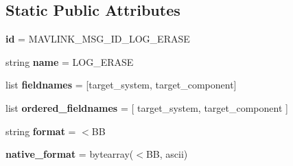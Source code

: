 \subsection*{Static Public Attributes}
\begin{DoxyCompactItemize}
\item 
\mbox{\label{classpymavlink_1_1dialects_1_1v10_1_1MAVLink__log__erase__message_a321eb50f2bdc57f03e38259f9eac8d6c}} 
{\bfseries id} = M\+A\+V\+L\+I\+N\+K\+\_\+\+M\+S\+G\+\_\+\+I\+D\+\_\+\+L\+O\+G\+\_\+\+E\+R\+A\+SE
\item 
\mbox{\label{classpymavlink_1_1dialects_1_1v10_1_1MAVLink__log__erase__message_a5597c5d067a3205a0be2e81559181d2f}} 
string {\bfseries name} = \textquotesingle{}L\+O\+G\+\_\+\+E\+R\+A\+SE\textquotesingle{}
\item 
\mbox{\label{classpymavlink_1_1dialects_1_1v10_1_1MAVLink__log__erase__message_a051bd4f738aa5256ac62944eaeee8a1f}} 
list {\bfseries fieldnames} = \mbox{[}\textquotesingle{}target\+\_\+system\textquotesingle{}, \textquotesingle{}target\+\_\+component\textquotesingle{}\mbox{]}
\item 
\mbox{\label{classpymavlink_1_1dialects_1_1v10_1_1MAVLink__log__erase__message_ab29ea4f6a81b7fcb25576674183d14e8}} 
list {\bfseries ordered\+\_\+fieldnames} = \mbox{[} \textquotesingle{}target\+\_\+system\textquotesingle{}, \textquotesingle{}target\+\_\+component\textquotesingle{} \mbox{]}
\item 
\mbox{\label{classpymavlink_1_1dialects_1_1v10_1_1MAVLink__log__erase__message_a495a851518a08601351b2eadcccf699f}} 
string {\bfseries format} = \textquotesingle{}$<$BB\textquotesingle{}
\item 
\mbox{\label{classpymavlink_1_1dialects_1_1v10_1_1MAVLink__log__erase__message_ab58f4baed3923048cab20cce858833b9}} 
{\bfseries native\+\_\+format} = bytearray(\textquotesingle{}$<$BB\textquotesingle{}, \textquotesingle{}ascii\textquotesingle{})

\end{DoxyCompactItemize}
